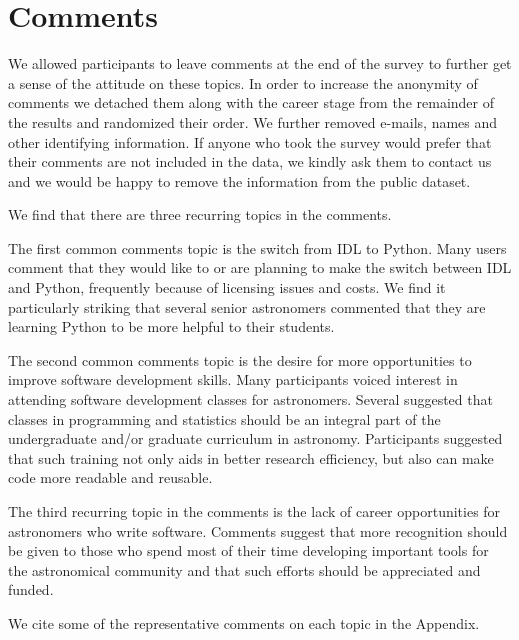 \section{Comments}
\label{sec:comments}

We allowed participants to leave comments at the end of the survey to further get a sense of the attitude on these topics. In order to increase the anonymity of comments we detached them along with the career stage from the remainder of the results and randomized their order. We further removed e-mails, names and other identifying information. If anyone who took the survey would prefer that their comments are not included in the data, we kindly ask them to contact us and we would be happy to remove the information from the public dataset. 

We find that there are three recurring topics in the comments. 

The first common comments topic is the switch from IDL to Python. Many users comment that they would like to or are planning to make the switch between IDL and Python, frequently because of licensing issues and costs. We find it particularly striking that several senior astronomers commented that they are learning Python to be more helpful to their students.

The second common comments topic is the desire for more opportunities to improve software development skills. Many participants voiced interest in attending software development classes for astronomers. Several suggested that classes in programming and statistics should be an integral part of the undergraduate and/or graduate curriculum in astronomy. Participants suggested that such training not only aids in better research efficiency, but also can make code more readable and reusable. 

The third recurring topic in the comments is the lack of career opportunities for astronomers who write software. Comments suggest that more recognition should be given to those who spend most of their time developing important tools for the astronomical community and that such efforts should be appreciated and funded. 

We cite some of the representative comments on each topic in the Appendix.
